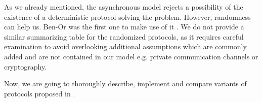 

As we already mentioned, the asynchronous model rejects a possibility of the existence of a deterministic protocol solving the problem. However, randomness can help us. Ben-Or was the first one to make use of it \cite{Ben83}. We do not provide a similar summarizing table for the randomized protocols, as it requires careful examination to avoid overlooking additional assumptions which are commonly added and are not contained in our model e.g. private communication channels or cryptography.

Now, we are going to thoroughly describe, implement and compare variants of protocols proposed in \cite{BG89,BGP89,Ben83}.